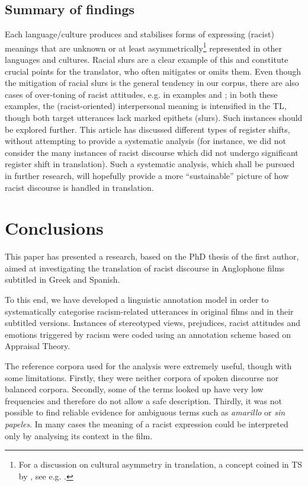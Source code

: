 \documentclass[output=paper]{LSP/langsci}
\begin{document}
\subsection{Summary of findings} \label{sec:2:5:2}
Each language/culture produces and stabilises forms of expressing (racist) meanings that are unknown or at least asymmetrically\footnote{For a discussion on cultural asymmetry in translation, a concept coined in TS by \citet{EvenZohar2005}, see e.g. \citet{Klaudy2012}.} represented in other languages and cultures. Racial slurs are a clear example of this and constitute crucial points for the translator, who often mitigates or omits them. Even though the mitigation of racial slurs is the general tendency in our corpus, there are also cases of over-toning of racist attitudes, e.g. in examples  and ; in both these examples, the (racist-oriented) interpersonal meaning is intensified in the TL, though both target utterances lack marked epithets (slurs). Such instances should be explored further. This article has discussed different types of register shifts, without attempting to provide a systematic analysis (for instance, we did not consider the many instances of racist discourse which did not undergo significant register shift in translation). Such a systematic analysis, which shall be pursued in further research, will hopefully provide a more “sustainable” picture of how racist discourse is handled in translation.

\section{Conclusions} \label{sec:2:6}

This paper has presented a research, based on the PhD thesis of the first author, aimed at investigating the translation of racist discourse in Anglophone films subtitled in Greek and Spanish.

To this end, we have developed a linguistic annotation model in order to systematically categorise racism-related utterances in original films and in their subtitled versions. Instances of stereotyped views, prejudices, racist attitudes and emotions triggered by racism were coded using an annotation scheme based on Appraisal Theory.

The reference corpora used for the analysis were extremely useful, though with some limitations. Firstly, they were neither corpora of spoken discourse nor balanced corpora. Secondly, some of the terms looked up have very low frequencies and therefore do not allow a safe description. Thirdly, it was not possible to find reliable evidence for ambiguous terms such as \textit{amarillo} or \textit{sin papeles}. In many cases the meaning of a racist expression could be interpreted only by analysing its context in the film.
\end{document}
